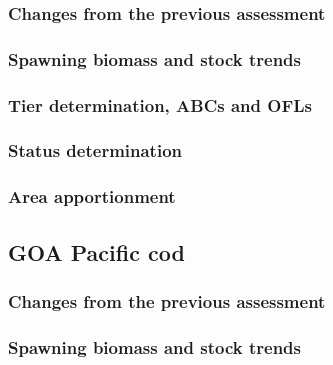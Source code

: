 \documentclass[]{tufte-handout}
\begin{document}
\hypertarget{changes-from-the-previous-assessment-8}{%
\subsubsection{Changes from the previous
assessment}\label{changes-from-the-previous-assessment-8}}

\hypertarget{spawning-biomass-and-stock-trends-8}{%
\subsubsection{Spawning biomass and stock
trends}\label{spawning-biomass-and-stock-trends-8}}

\hypertarget{tier-determination-abcs-and-ofls-7}{%
\subsubsection{Tier determination, ABCs and
OFLs}\label{tier-determination-abcs-and-ofls-7}}

\hypertarget{status-determination-8}{%
\subsubsection{Status determination}\label{status-determination-8}}

\hypertarget{area-apportionment-8}{%
\subsubsection{Area apportionment}\label{area-apportionment-8}}

\hypertarget{goa-pacific-cod-8}{%
\subsection{GOA Pacific cod}\label{goa-pacific-cod-8}}

\hypertarget{changes-from-the-previous-assessment-9}{%
\subsubsection{Changes from the previous
assessment}\label{changes-from-the-previous-assessment-9}}

\hypertarget{spawning-biomass-and-stock-trends-9}{%
\subsubsection{Spawning biomass and stock
trends}\label{spawning-biomass-and-stock-trends-9}}
\end{document}
